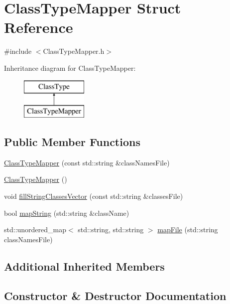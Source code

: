\hypertarget{struct_class_type_mapper}{}\section{Class\+Type\+Mapper Struct Reference}
\label{struct_class_type_mapper}


{\ttfamily \#include $<$Class\+Type\+Mapper.\+h$>$}

Inheritance diagram for Class\+Type\+Mapper\+:\begin{figure}[H]
\begin{center}
\leavevmode
\includegraphics[height=2.000000cm]{struct_class_type_mapper}
\end{center}
\end{figure}
\subsection*{Public Member Functions}
\begin{DoxyCompactItemize}
\item 
\hyperlink{struct_class_type_mapper_abc46bb3ad740aaccdcb0914941a85cbe}{Class\+Type\+Mapper} (const std\+::string \&class\+Names\+File)
\item 
\hyperlink{struct_class_type_mapper_a4b16c84f275540ed654841dc7a33484a}{Class\+Type\+Mapper} ()
\item 
void \hyperlink{struct_class_type_mapper_a999c63158f2d0093de9d60734e6605fb}{fill\+String\+Classes\+Vector} (const std\+::string \&classes\+File)
\item 
bool \hyperlink{struct_class_type_mapper_af76d00ce9a2267710ee9119f0bb2e607}{map\+String} (std\+::string \&class\+Name)
\item 
std\+::unordered\+\_\+map$<$ std\+::string, std\+::string $>$ \hyperlink{struct_class_type_mapper_afca49a200b7561bf9120a6a0312de119}{map\+File} (std\+::string class\+Names\+File)
\end{DoxyCompactItemize}
\subsection*{Additional Inherited Members}


\subsection{Constructor \& Destructor Documentation}
\mbox{\label{struct_class_type_mapper_abc46bb3ad740aaccdcb0914941a85cbe}} 
